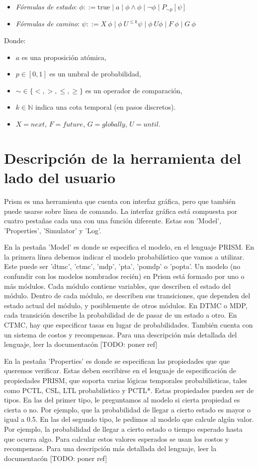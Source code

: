 \documentclass[runningheads]{llncs}
\begin{document}
\begin{itemize}
    \item \textit{Fórmulas de estado}: \( \phi ::= \text{true} \mid a \mid \phi \land \phi \mid \neg \phi \mid P_{\sim p}[\psi]\)
    \item \textit{Fórmulas de camino}: \(\psi ::= X\ \phi \mid \phi \ U^{\leq k} \psi \mid \phi \ U \phi \mid F\ \phi \mid G\ \phi\)
\end{itemize}
Donde:
\begin{itemize}
    \item\(a\) es una proposición atómica,
    \item\(p \in [0,1]\) es un umbral de probabilidad,
    \item\(\sim \in \{<, >, \leq, \geq\}\) es un operador de comparación,
    \item\(k \in \mathbb{N}\) indica una cota temporal (en pasos discretos).
    \item \(X=next\), \(F=future\), \(G=globally\), \(U=until\).
\end{itemize}

\section{Descripción de la herramienta del lado del usuario}

Prism es una herramienta que cuenta con interfaz gráfica, pero que también puede usarse sobre línea de comando. La interfaz gráfica está compuesta por cuatro pestañas cada una con una función diferente. Estas son 'Model', 'Properties', 'Simulator' y 'Log'.

En la pestaña 'Model' es donde se especifica el modelo, en el lenguaje PRISM. En la primera línea debemos indicar el modelo probabilístico que vamos a utilizar. Este puede ser 'dtmc', 'ctmc', 'mdp', 'pta', 'pomdp' o 'popta'. Un modelo (no confundir con los modelos nombrados recién) en Prism está formado por uno o más módulos. Cada módulo contiene variables, que describen el estado del módulo. Dentro de cada módulo, se describen sus transiciones, que dependen del estado actual del módulo, y posiblemente de otros módulos. En DTMC o MDP, cada transición describe la probabilidad de de pasar de un estado a otro. En CTMC, hay que especificar tasas en lugar de probabilidades. También cuenta con un sistema de costos y recompensas.
Para una descripción más detallada del lenguaje, leer la documentacón [TODO: poner ref]

En la pestaña 'Properties' es donde se especifican las propiedades que que queremos verificar. Estas deben escribirse en el lenguaje de especificación de propiedades PRISM, que soporta varias lógicas temporales probabilísticas, tales como PCTL, CSL, LTL probabilístico y PCTL*. Estas propiedades pueden ser de tipos. En las del primer tipo, le preguntamos al modelo si cierta propiedad es cierta o no. Por ejemplo, que la probabilidad de llegar a cierto estado es mayor o igual a 0.5. En las del segundo tipo, le pedimos al modelo que calcule algún valor. Por ejemplo, la probabilidad de llegar a cierto estado o tiempo esperado hasta que ocurra algo. Para calcular estos valores esperados se usan los costos y recompensas.
Para una descripción más detallada del lenguaje, leer la documentacón [TODO: poner ref]
\end{document}
